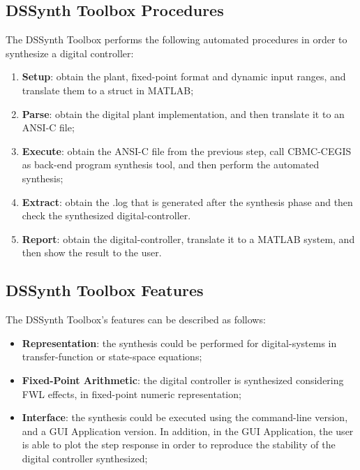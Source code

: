 \documentclass[sigconf]{acmart}
\newcommand\tool{{DSSynth Toolbox}\xspace}
\begin{document}
\subsection{\tool Procedures}

The \tool performs the following automated procedures in order to synthesize a digital controller:

\begin{enumerate}
\item \textbf{Setup}: obtain the plant, fixed-point format and dynamic input ranges, and translate them to a struct in MATLAB;
\item \textbf{Parse}: obtain the digital plant implementation, and then translate it to an ANSI-C file;
\item \textbf{Execute}: obtain the ANSI-C file from the previous step, call CBMC-CEGIS as back-end program synthesis tool, and then perform the automated synthesis;
\item \textbf{Extract}: obtain the .log that is generated after the synthesis phase and then check the synthesized digital-controller.
\item \textbf{Report}: obtain the digital-controller, translate it to a MATLAB system, and then show the result to the user.
\end{enumerate}

\subsection{\tool Features}

The \tool's features can be described as follows:

\begin{itemize}
\item \textbf{Representation}: the synthesis could be performed for digital-systems in transfer-function or state-space equations;
\item \textbf{Fixed-Point Arithmetic}: the digital controller is synthesized considering FWL effects, in fixed-point numeric representation;
\item \textbf{Interface}: the synthesis could be executed using the command-line version, and a GUI Application version. In addition, in the GUI Application, the user is able to plot the step response in order to reproduce the stability of the digital controller synthesized;
\end{itemize}
\end{document}
